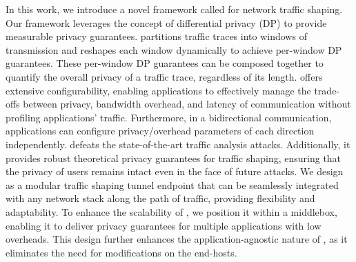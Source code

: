 In this work, we introduce a novel framework called {\sys} for network traffic shaping.
Our framework leverages the concept of differential privacy (DP) to provide measurable privacy guarantees.
{\sys} partitions traffic traces into windows of transmission and reshapes each window dynamically to achieve per-window DP guarantees.
These per-window DP guarantees can be composed together to quantify the overall privacy of a traffic trace, regardless of its length.
{\sys} offers extensive configurability, enabling applications to effectively manage the trade-offs between privacy, bandwidth overhead, and latency of communication without profiling applications' traffic.
Furthermore, in a bidirectional communication, applications can configure privacy/overhead parameters of each direction independently.
{\sys} defeats the state-of-the-art traffic analysis attacks.
Additionally, it provides robust theoretical privacy guarantees for traffic shaping, ensuring that the privacy of users remains intact even in the face of future attacks.
We design {\sys} as a modular traffic shaping tunnel endpoint that can be seamlessly integrated with any network stack along the path of traffic, providing flexibility and adaptability.
To enhance the scalability of {\sys}, we position it within a middlebox, enabling it to deliver privacy guarantees for multiple applications with low overheads. 
This design further enhances the application-agnostic nature of {\sys}, as it eliminates the need for modifications on the end-hosts. 




